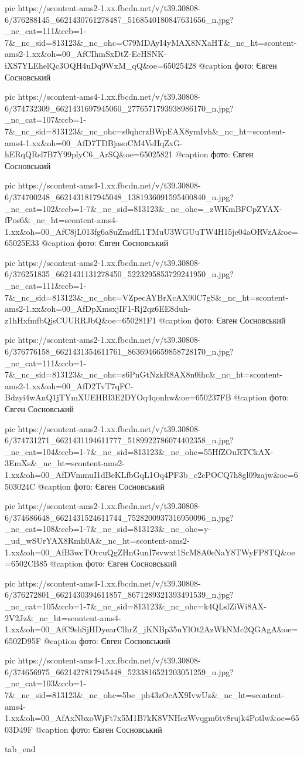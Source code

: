     pic https://scontent-ams2-1.xx.fbcdn.net/v/t39.30808-6/376288145_6621430761278487_5168540180847631656_n.jpg?_nc_cat=111&ccb=1-7&_nc_sid=813123&_nc_ohc=C79MDAyI4yMAX8NXaHT&_nc_ht=scontent-ams2-1.xx&oh=00_AfCIhmSxDtZ-EcHSNK-iXS7YLEhelQc3OQH4uDq9WxM_qQ&oe=65025428
     @caption фото: Євген Сосновський

     pic https://scontent-ams4-1.xx.fbcdn.net/v/t39.30808-6/374732309_6621431697945060_2776571793938986170_n.jpg?_nc_cat=107&ccb=1-7&_nc_sid=813123&_nc_ohc=s0qhcrzBWpEAX8ymIvh&_nc_ht=scontent-ams4-1.xx&oh=00_AfD7TDBjasoCM4VsHqZxG-hERqQRsl7B7Y99plyC6_ArSQ&oe=65025821
     @caption фото: Євген Сосновський

     pic https://scontent-ams4-1.xx.fbcdn.net/v/t39.30808-6/374700248_6621431817945048_1381936091595400840_n.jpg?_nc_cat=102&ccb=1-7&_nc_sid=813123&_nc_ohc=_zWKmBFCpZYAX-fPos6&_nc_ht=scontent-ams4-1.xx&oh=00_AfC8jL013fg6a8uZmdfL1TMuU3WGUuTW4H15je04aORVzA&oe=65025E33
     @caption фото: Євген Сосновський

     pic https://scontent-ams2-1.xx.fbcdn.net/v/t39.30808-6/376251835_6621431131278450_5223295853729241950_n.jpg?_nc_cat=111&ccb=1-7&_nc_sid=813123&_nc_ohc=VZpecAYBrXcAX90C7gS&_nc_ht=scontent-ams2-1.xx&oh=00_AfDpXmsxjIF1-Rj2qz6EE8duh-z1hHxfmfbQjsCUURRJbQ&oe=650281F1
     @caption фото: Євген Сосновський

     pic https://scontent-ams2-1.xx.fbcdn.net/v/t39.30808-6/376776158_6621431354611761_8636946659858728170_n.jpg?_nc_cat=111&ccb=1-7&_nc_sid=813123&_nc_ohc=s6PnGtNzkR8AX8n0ihc&_nc_ht=scontent-ams2-1.xx&oh=00_AfD2TvT7qFC-Bdzyi4wAnQ1jTYmXUEHBI3E2DYOq4qonhw&oe=650237FB
     @caption фото: Євген Сосновський

     pic https://scontent-ams2-1.xx.fbcdn.net/v/t39.30808-6/374731271_6621431194611777_5189922786074402358_n.jpg?_nc_cat=104&ccb=1-7&_nc_sid=813123&_nc_ohc=55HfZOuRTCkAX-3EmXs&_nc_ht=scontent-ams2-1.xx&oh=00_AfDVmmuI1dBeKLfbGqL1Oq4PF3b_c2cPOCQ7h8gl09zajw&oe=6503024C
     @caption фото: Євген Сосновський

     pic https://scontent-ams2-1.xx.fbcdn.net/v/t39.30808-6/374686648_6621431524611744_7528200937316950096_n.jpg?_nc_cat=108&ccb=1-7&_nc_sid=813123&_nc_ohc=y-_ud_wSUrYAX8Rmh0A&_nc_ht=scontent-ams2-1.xx&oh=00_AfB3wcTOrcuQgZHnGunI7svwxt1ScM8A0eNaY8TWyFP8TQ&oe=6502CB85
     @caption фото: Євген Сосновський

     pic https://scontent-ams4-1.xx.fbcdn.net/v/t39.30808-6/376272801_6621430394611857_8671289321393491539_n.jpg?_nc_cat=105&ccb=1-7&_nc_sid=813123&_nc_ohc=k4QLslZiWi8AX-2V2Jz&_nc_ht=scontent-ams4-1.xx&oh=00_AfC9shSjHDyearClhrZ_jKNBp35uYlOt2AzWkNMc2QGAgA&oe=6502D95F
     @caption фото: Євген Сосновський

     pic https://scontent-ams4-1.xx.fbcdn.net/v/t39.30808-6/374656975_6621427817945448_5233816521203051259_n.jpg?_nc_cat=103&ccb=1-7&_nc_sid=813123&_nc_ohc=5be_ph43zOcAX9IvwUz&_nc_ht=scontent-ams4-1.xx&oh=00_AfAxNbxoWjFt7x5M1B7kK8VNHczWvqgm6tv8rujk4Potlw&oe=6503D49F
     @caption фото: Євген Сосновський

  tab_end
\fi
